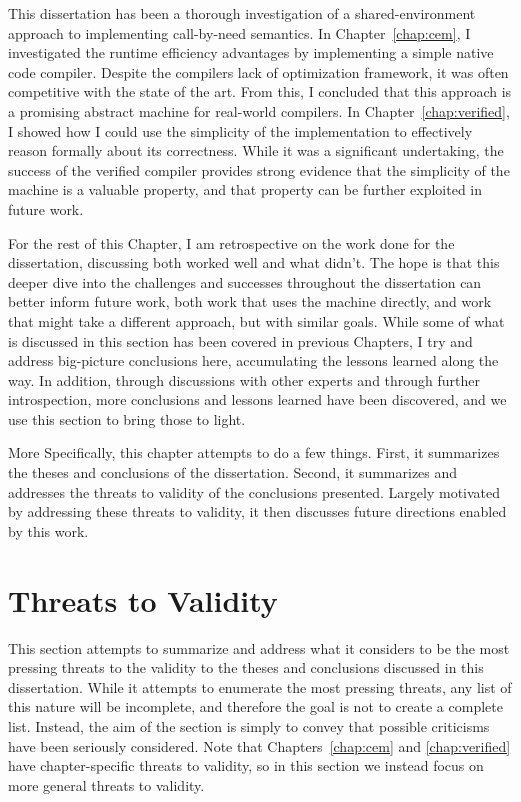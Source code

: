 This dissertation has been a thorough investigation of a shared-environment
approach to implementing call-by-need semantics. In Chapter~\ref{chap:cem}, I
investigated the runtime efficiency advantages by implementing a simple native
code compiler. Despite the compilers lack of optimization framework, it was
often competitive with the state of the art. From this, I concluded that this
approach is a promising abstract machine for real-world compilers. In
Chapter~\ref{chap:verified}, I showed how I could use the simplicity of the
implementation to effectively reason formally about its correctness. While it
was a significant undertaking, the success of the verified compiler provides
strong evidence that the simplicity of the machine is a valuable property, and
that property can be further exploited in future work.

For the rest of this Chapter, I am retrospective on the work done for the
dissertation, discussing both worked well and what didn't. The hope is that this
deeper dive into the challenges and successes throughout the dissertation can
better inform future work, both work that uses the \ce machine directly, and
work that might take a different approach, but with similar goals. While some of
what is discussed in this section has been covered in previous Chapters, I try
and address big-picture conclusions here, accumulating the lessons learned along
the way. In addition, through discussions with other experts and through further
introspection, more conclusions and lessons learned have been discovered, and we
use this section to bring those to light. 

More Specifically, this chapter attempts to do a few things. First, it
summarizes the theses and conclusions of the dissertation. Second, it summarizes
and addresses the threats to validity of the conclusions presented.  Largely
motivated by addressing these threats to validity, it then discusses future
directions enabled by this work. 

\section{Threats to Validity}

This section attempts to summarize and address what it considers to be the most
pressing threats to the validity to the theses and conclusions discussed in this
dissertation. While it attempts to enumerate the most pressing threats, any list
of this nature will be incomplete, and therefore the goal is not to create a
complete list. Instead, the aim of the section is simply to convey that possible
criticisms have been seriously considered. Note that Chapters~\ref{chap:cem} and
\ref{chap:verified} have chapter-specific threats to validity, so in this
section we instead focus on more general threats to validity. 

